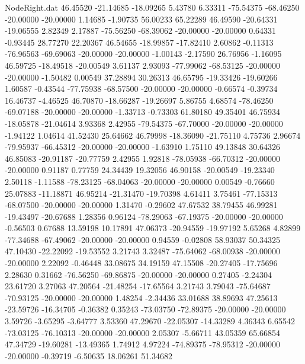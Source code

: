 \begin{filecontents}{NodeRight.dat}
  46.45520  -21.14685  -18.09265     5.43780    6.33311  -75.54375  -68.46250  -20.00000  -20.00000    1.14685   -1.90735   56.00233   65.22289
  46.49590  -20.64331  -19.06555     2.82349    2.17887  -75.56250  -68.39062  -20.00000  -20.00000    0.64331   -0.93445   28.77270   22.20367
  46.54655  -18.99857  -17.82410     2.60862   -0.11313  -76.96563  -69.69063  -20.00000  -20.00000   -1.00143   -2.17590   26.76956   -1.16095
  46.59725  -18.49518  -20.00549     3.61137    2.93093  -77.99062  -68.53125  -20.00000  -20.00000   -1.50482    0.00549   37.28894   30.26313
  46.65795  -19.33426  -19.60266     1.60587   -0.43544  -77.75938  -68.57500  -20.00000  -20.00000   -0.66574   -0.39734   16.46737   -4.46525
  46.70870  -18.66287  -19.26697     5.86755    4.68574  -78.46250  -69.07188  -20.00000  -20.00000   -1.33713   -0.73303   61.80180   49.35401
  46.75934  -18.05878  -21.04614     3.93368    2.42955  -79.54375  -67.70000  -20.00000  -20.00000   -1.94122    1.04614   41.52430   25.64662
  46.79998  -18.36090  -21.75110     4.75736    2.96674  -79.95937  -66.45312  -20.00000  -20.00000   -1.63910    1.75110   49.13848   30.64326
  46.85083  -20.91187  -20.77759     2.42955    1.92818  -78.05938  -66.70312  -20.00000  -20.00000    0.91187    0.77759   24.34439   19.32056
  46.90158  -20.00549  -19.23340     2.50118   -1.11588  -78.23125  -68.04063  -20.00000  -20.00000    0.00549   -0.76660   25.07883  -11.18871
  46.95214  -21.31470  -19.70398     4.61411    3.75461  -77.15313  -68.07500  -20.00000  -20.00000    1.31470   -0.29602   47.67532   38.79455
  46.99281  -19.43497  -20.67688     1.28356    0.96124  -78.29063  -67.19375  -20.00000  -20.00000   -0.56503    0.67688   13.59198   10.17891
  47.06373  -20.94559  -19.97192     5.65268    4.82899  -77.34688  -67.49062  -20.00000  -20.00000    0.94559   -0.02808   58.93037   50.34325
  47.10430  -22.22092  -19.53552     3.21743    3.32487  -75.64062  -68.00938  -20.00000  -20.00000    2.22092   -0.46448   33.08675   34.19159
  47.15508  -20.27405  -17.75696     2.28630    0.31662  -76.56250  -69.86875  -20.00000  -20.00000    0.27405   -2.24304   23.61720    3.27063
  47.20564  -21.48254  -17.65564     3.21743    3.79043  -75.64687  -70.93125  -20.00000  -20.00000    1.48254   -2.34436   33.01688   38.89693
  47.25613  -23.59726  -16.34705    -0.36382    0.35243  -73.03750  -72.89375  -20.00000  -20.00000    3.59726   -3.65295   -3.64777    3.53360
  47.29670  -22.05307  -14.33289     4.36343    6.65542  -73.03125  -76.10313  -20.00000  -20.00000    2.05307   -5.66711   43.05359   65.66854
  47.34729  -19.60281  -13.49365     1.74912    4.97224  -74.89375  -78.95312  -20.00000  -20.00000   -0.39719   -6.50635   18.06261   51.34682

\end{filecontents}
